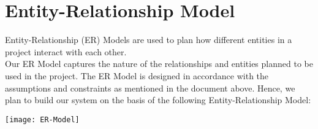 
\section*{\Huge Entity-Relationship Model}
\vspace*{10pt}
Entity-Relationship (ER) Models are used to plan how different entities in a project interact with each other. \\
\newline
Our ER Model captures the nature of the relationships and entities planned to be used in the project.
The ER Model is designed in accordance with the assumptions and constraints as mentioned in the document above.
Hence, we plan to build our system on the basis of the following Entity-Relationship Model:
\vspace*{10pt}
\begin{center}
    \hspace*{-37pt}
    \texttt{[image: ER-Model]}
\end{center}

